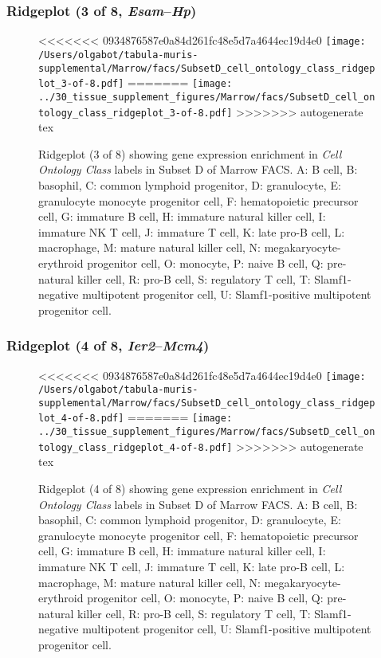 \clearpage

\subsubsection{Ridgeplot (3 of 8, \emph{Esam}--\emph{Hp})}
\begin{figure}[h]
\centering
<<<<<<< 0934876587e0a84d261fc48e5d7a4644ec19d4e0
\texttt{[image: /Users/olgabot/tabula-muris-supplemental/Marrow/facs/SubsetD\_cell\_ontology\_class\_ridgeplot\_3-of-8.pdf]}
=======
\texttt{[image: ../30\_tissue\_supplement\_figures/Marrow/facs/SubsetD\_cell\_ontology\_class\_ridgeplot\_3-of-8.pdf]}
>>>>>>> autogenerate tex

\caption{ Ridgeplot (3 of 8)  showing gene expression enrichment in \emph{Cell Ontology Class} labels in Subset D of Marrow FACS. A: B cell, B: basophil, C: common lymphoid progenitor, D: granulocyte, E: granulocyte monocyte progenitor cell, F: hematopoietic precursor cell, G: immature B cell, H: immature natural killer cell, I: immature NK T cell, J: immature T cell, K: late pro-B cell, L: macrophage, M: mature natural killer cell, N: megakaryocyte-erythroid progenitor cell, O: monocyte, P: naive B cell, Q: pre-natural killer cell, R: pro-B cell, S: regulatory T cell, T: Slamf1-negative multipotent progenitor cell, U: Slamf1-positive multipotent progenitor cell.}
\end{figure}


\clearpage

\subsubsection{Ridgeplot (4 of 8, \emph{Ier2}--\emph{Mcm4})}
\begin{figure}[h]
\centering
<<<<<<< 0934876587e0a84d261fc48e5d7a4644ec19d4e0
\texttt{[image: /Users/olgabot/tabula-muris-supplemental/Marrow/facs/SubsetD\_cell\_ontology\_class\_ridgeplot\_4-of-8.pdf]}
=======
\texttt{[image: ../30\_tissue\_supplement\_figures/Marrow/facs/SubsetD\_cell\_ontology\_class\_ridgeplot\_4-of-8.pdf]}
>>>>>>> autogenerate tex

\caption{ Ridgeplot (4 of 8)  showing gene expression enrichment in \emph{Cell Ontology Class} labels in Subset D of Marrow FACS. A: B cell, B: basophil, C: common lymphoid progenitor, D: granulocyte, E: granulocyte monocyte progenitor cell, F: hematopoietic precursor cell, G: immature B cell, H: immature natural killer cell, I: immature NK T cell, J: immature T cell, K: late pro-B cell, L: macrophage, M: mature natural killer cell, N: megakaryocyte-erythroid progenitor cell, O: monocyte, P: naive B cell, Q: pre-natural killer cell, R: pro-B cell, S: regulatory T cell, T: Slamf1-negative multipotent progenitor cell, U: Slamf1-positive multipotent progenitor cell.}
\end{figure}


